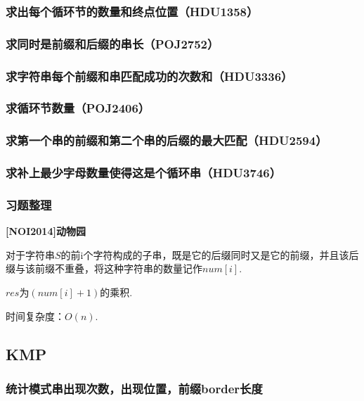 \documentclass{article}
\begin{document}
\subsubsection{求出每个循环节的数量和终点位置（HDU1358）}

\subsubsection{求同时是前缀和后缀的串长（POJ2752）}

\subsubsection{求字符串每个前缀和串匹配成功的次数和（HDU3336）}

\subsubsection{求循环节数量（POJ2406）}

\subsubsection{求第一个串的前缀和第二个串的后缀的最大匹配（HDU2594）}

\subsubsection{求补上最少字母数量使得这是个循环串（HDU3746）}

\subsubsection{习题整理}
\textbf{[NOI2014]动物园}\par
对于字符串$S$的前i个字符构成的子串，既是它的后缀同时又是它的前缀，并且该后缀与该前缀不重叠，将这种字符串的数量记作$num[i]$.\par
$res$为$(num[i]+1)$的乘积.\par
时间复杂度：$O(n).$


\subsection{KMP}
\subsubsection{统计模式串出现次数，出现位置，前缀border长度}

\end{document}
